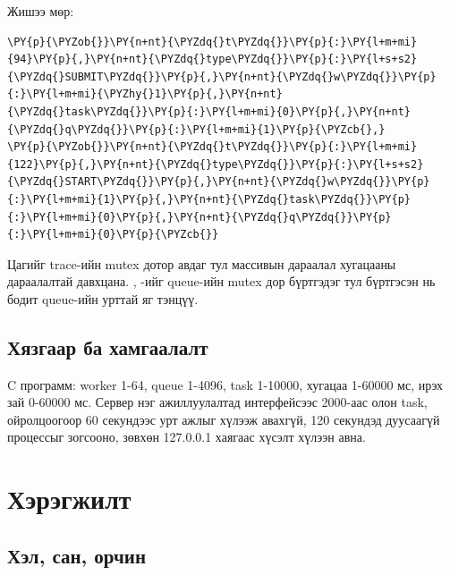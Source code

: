 \documentclass[12pt,a4paper]{article}
\begin{document}
Жишээ мөр:

\par\noindent\begin{minipage}{\linewidth}\setlength{\topsep}{1pt}\setlength{\partopsep}{0pt}
\begin{Verbatim}[commandchars=\\\{\}]
\PY{p}{\PYZob{}}\PY{n+nt}{\PYZdq{}t\PYZdq{}}\PY{p}{:}\PY{l+m+mi}{94}\PY{p}{,}\PY{n+nt}{\PYZdq{}type\PYZdq{}}\PY{p}{:}\PY{l+s+s2}{\PYZdq{}SUBMIT\PYZdq{}}\PY{p}{,}\PY{n+nt}{\PYZdq{}w\PYZdq{}}\PY{p}{:}\PY{l+m+mi}{\PYZhy{}1}\PY{p}{,}\PY{n+nt}{\PYZdq{}task\PYZdq{}}\PY{p}{:}\PY{l+m+mi}{0}\PY{p}{,}\PY{n+nt}{\PYZdq{}q\PYZdq{}}\PY{p}{:}\PY{l+m+mi}{1}\PY{p}{\PYZcb{},}
\PY{p}{\PYZob{}}\PY{n+nt}{\PYZdq{}t\PYZdq{}}\PY{p}{:}\PY{l+m+mi}{122}\PY{p}{,}\PY{n+nt}{\PYZdq{}type\PYZdq{}}\PY{p}{:}\PY{l+s+s2}{\PYZdq{}START\PYZdq{}}\PY{p}{,}\PY{n+nt}{\PYZdq{}w\PYZdq{}}\PY{p}{:}\PY{l+m+mi}{1}\PY{p}{,}\PY{n+nt}{\PYZdq{}task\PYZdq{}}\PY{p}{:}\PY{l+m+mi}{0}\PY{p}{,}\PY{n+nt}{\PYZdq{}q\PYZdq{}}\PY{p}{:}\PY{l+m+mi}{0}\PY{p}{\PYZcb{}}
\end{Verbatim}
\end{minipage}

Цагийг trace-ийн mutex дотор авдаг тул массивын дараалал хугацааны дараалалтай давхцана. , -ийг queue-ийн mutex дор бүртгэдэг тул бүртгэсэн  нь бодит queue-ийн урттай яг тэнцүү.

\subsection{Хязгаар ба хамгаалалт}

C программ: worker 1-64, queue 1-4096, task 1-10000, хугацаа 1-60000 мс, ирэх зай 0-60000 мс. Сервер нэг ажиллуулалтад интерфейсээс 2000-аас олон task, ойролцоогоор 60 секундээс урт ажлыг хүлээж авахгүй, 120 секундэд дуусаагүй процессыг зогсооно, зөвхөн 127.0.0.1 хаягаас хүсэлт хүлээн авна.

\section{Хэрэгжилт}

\subsection{Хэл, сан, орчин}
\end{document}
